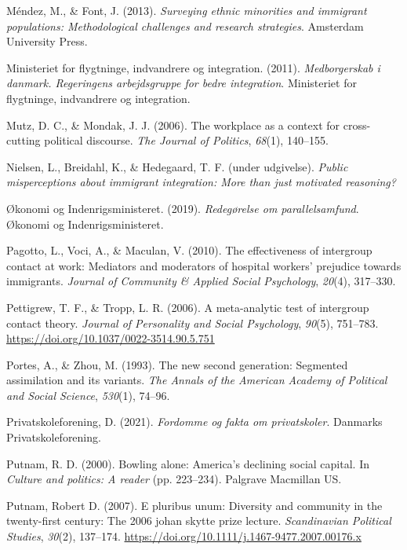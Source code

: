 \documentclass[
]{book}
\newlength{\cslhangindent}
\newenvironment{CSLReferences}[2] %
 {\begin{list}{}{%
  \setlength{\itemindent}{0pt}
  \setlength{\leftmargin}{0pt}
  \setlength{\parsep}{0pt}
  \ifodd #1
   \setlength{\leftmargin}{\cslhangindent}
   \setlength{\itemindent}{-1\cslhangindent}
  \fi
  \setlength{\itemsep}{#2\baselineskip}}}
 {\end{list}}
\begin{document}
\begin{CSLReferences}{1}{0}
Méndez, M., \& Font, J. (2013). \emph{Surveying ethnic minorities and immigrant populations: Methodological challenges and research strategies}. Amsterdam University Press.

Ministeriet for flygtninge, indvandrere og integration. (2011). \emph{Medborgerskab i danmark. Regeringens arbejdsgruppe for bedre integration}. Ministeriet for flygtninge, indvandrere og integration.

Mutz, D. C., \& Mondak, J. J. (2006). The workplace as a context for cross-cutting political discourse. \emph{The Journal of Politics}, \emph{68}(1), 140--155.

Nielsen, L., Breidahl, K., \& Hedegaard, T. F. (under udgivelse). \emph{Public misperceptions about immigrant integration: More than just motivated reasoning?}

Økonomi og Indenrigsministeret. (2019). \emph{Redegørelse om parallelsamfund}. {Økonomi og Indenrigsministeret}.

Pagotto, L., Voci, A., \& Maculan, V. (2010). The effectiveness of intergroup contact at work: Mediators and moderators of hospital workers' prejudice towards immigrants. \emph{Journal of Community \& Applied Social Psychology}, \emph{20}(4), 317--330.

Pettigrew, T. F., \& Tropp, L. R. (2006). A meta-analytic test of intergroup contact theory. \emph{Journal of Personality and Social Psychology}, \emph{90}(5), 751--783. \url{https://doi.org/10.1037/0022-3514.90.5.751}

Portes, A., \& Zhou, M. (1993). The new second generation: Segmented assimilation and its variants. \emph{The Annals of the American Academy of Political and Social Science}, \emph{530}(1), 74--96.

Privatskoleforening, D. (2021). \emph{Fordomme og fakta om privatskoler}. Danmarks Privatskoleforening.

Putnam, R. D. (2000). Bowling alone: America's declining social capital. In \emph{Culture and politics: A reader} (pp. 223--234). Palgrave Macmillan US.

Putnam, Robert D. (2007). E pluribus unum: Diversity and community in the twenty-first century: The 2006 johan skytte prize lecture. \emph{Scandinavian Political Studies}, \emph{30}(2), 137--174. \url{https://doi.org/10.1111/j.1467-9477.2007.00176.x}


\end{CSLReferences}
\end{document}

